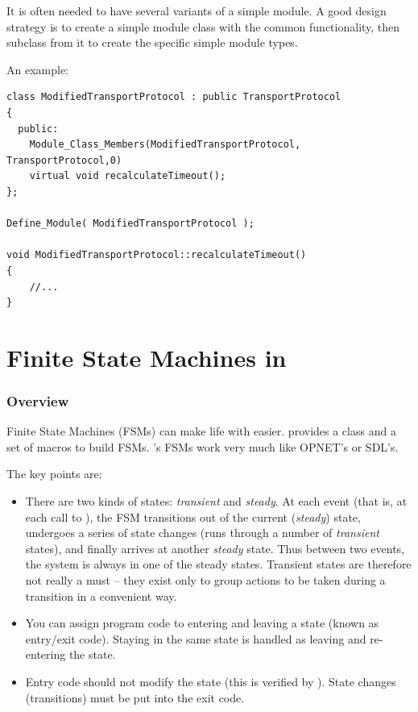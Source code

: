 It is often needed to have several variants of a simple module.
A good design strategy is to create a simple module class with
the common functionality, then subclass from it to create the
specific simple module types.


An example:

\begin{verbatim}
class ModifiedTransportProtocol : public TransportProtocol
{
  public:
    Module_Class_Members(ModifiedTransportProtocol, TransportProtocol,0)
    virtual void recalculateTimeout();
};

Define_Module( ModifiedTransportProtocol );

void ModifiedTransportProtocol::recalculateTimeout()
{
    //...
}
\end{verbatim}


\section{Finite State Machines in {\opp}}

\subsubsection{Overview}


Finite State Machines (FSMs)
can make life with  easier. {\opp} provides a
class and a set of macros to build FSMs. {\opp}'s FSMs work very much
like OPNET's or SDL's.


The key points are:
\begin{itemize}
\item{There are two kinds of states:
    \textit{transient} and
    \textit{steady}. At each event (that is, at
    each call to ), the FSM transitions out of
    the current (\textit{steady}) state, undergoes a series of state
    changes (runs through a number of \textit{transient} states), and
    finally arrives at another \textit{steady} state. Thus between two
    events, the system is always in one of the steady states.
    Transient states are therefore not really a must -- they exist
    only to group actions to be taken during a transition in a
    convenient way.}
\item{You can assign program code to entering and leaving a state
    (known as entry/exit code).
    Staying in the same state is handled as leaving and re-entering
    the state.}
\item{Entry code should not modify the state (this is verified by
    {\opp}).  State changes (transitions) must be put into the exit
    code.}
\end{itemize}

